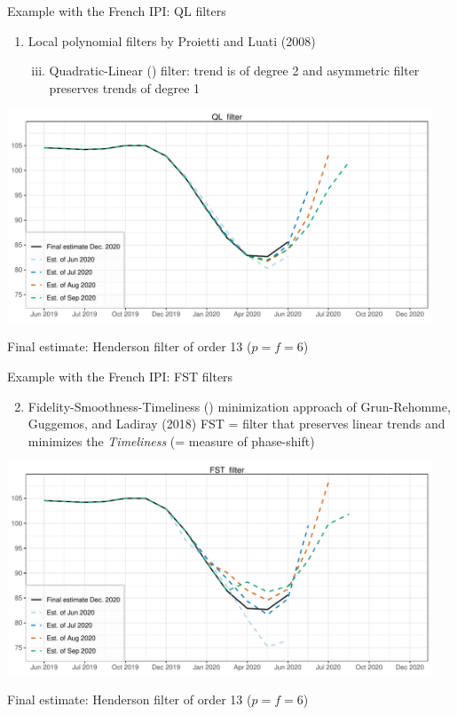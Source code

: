 \documentclass[10pt,xcolor=table,color={dvipsnames,usenames},ignorenonframetext,usepdftitle=false,english]{beamer}
\providecommand{\tightlist}{%
  \setlength{\parskip}{0pt}
  }
\newcommand\1{\mathds{1}}
\begin{document}
\begin{frame}{Example with the French IPI: QL filters}
\protect\hypertarget{example-with-the-french-ipi-ql-filters}{}
\footnotesize

\begin{enumerate}
\item
  Local polynomial filters by Proietti and Luati (2008)

  \begin{enumerate}
  [i.]
  \setcounter{enumii}{2}
  \tightlist
  \item
    Quadratic-Linear () filter: trend is of degree 2 and
    asymmetric filter preserves trends of degree 1
  \end{enumerate}
\end{enumerate}

\includegraphics[width=0.95\textwidth,height=\textheight]{img/illustration_slides_3.pdf}

Final estimate: Henderson filter of order 13 (\(p=f=6\))
\end{frame}

\begin{frame}{Example with the French IPI: FST filters}
\protect\hypertarget{example-with-the-french-ipi-fst-filters}{}
\footnotesize

\begin{enumerate}
\setcounter{enumi}{1}
\tightlist
\item
  Fidelity-Smoothness-Timeliness () minimization
  approach of Grun-Rehomme, Guggemos, and Ladiray (2018)
  \faArrowCircleRight{} FST = filter that preserves linear trends and
  minimizes the \emph{Timeliness} (= measure of phase-shift)
\end{enumerate}

\includegraphics[width=0.95\textwidth,height=\textheight]{img/illustration_slides_4.pdf}

Final estimate: Henderson filter of order 13 (\(p=f=6\))
\end{frame}
\end{document}
